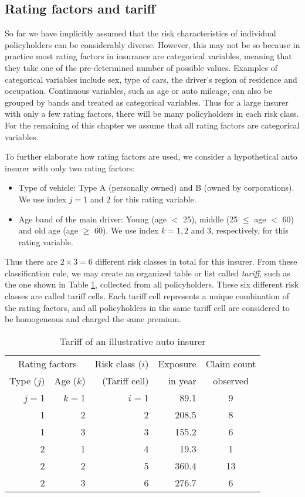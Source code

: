\documentclass[12pt]{article}
\begin{document}
\subsection{Rating factors and tariff}
So far we have implicitly assumed that the risk characteristics of individual policyholders can be considerably diverse. However, this may not be so because in practice most rating factors in insurance are categorical variables, meaning that they take one of the pre-determined number of possible values. Examples of categorical variables include sex, type of cars, the driver's region of residence and occupation. Continuous variables, such as age or auto mileage, can also be grouped by bands and treated as categorical variables. Thus for a large insurer with only a few rating factors, there will be many policyholders in each risk class. For the remaining of this chapter we assume that all rating factors are categorical variables. 

To further elaborate how rating factors are used, we consider a hypothetical auto insurer with only two rating factors:
\begin{itemize}
  \item Type of vehicle: Type A (personally owned) and B (owned by corporations). We use index $j=1$ and $2$ for this rating variable.
  \item Age band of the main driver:  Young (age $<$ 25), middle (25 $\le$ age $<$ 60) and old age (age $\ge$ 60). We use index $k=1, 2$ and $3$, respectively, for this rating variable.
\end{itemize}
Thus there are $2 \times 3=6$ different risk classes in total for this insurer. From these classification rule, we may create an organized  table or list called \textit{tariff}, such as the one shown in Table \ref{tab.tariff.1}, collected from all policyholders. These six different risk classes are called tariff cells. Each tariff cell represents a unique combination of the rating factors, and all policyholders in the same tariff cell are considered to be homogeneous and charged the same premium.
\begin{table}[htp]
\caption{Tariff of an illustrative auto insurer}
\begin{center}
\begin{tabular}{rrrrc}
 \hline
 \multicolumn{2}{c}{Rating factors } &  Risk class ($i$)& Exposure & Claim count \\
 \cline{1-2} 
Type ($j$) & Age ($k$) & (Tariff cell) &  in year & observed\\
\hline \hline
$j=$1 & $k=$1 & $i=$1 & 89.1 & 9\\
1 & 2 &2  & 208.5& 8\\
1 & 3 & 3 & 155.2 & 6  \\
2  & 1 & 4 & 19.3 & 1 \\
2  & 2 & 5 & 360.4 & 13 \\
2   & 3 & 6 & 276.7 & 6 \\ \hline
\end{tabular}
\end{center}
\label{tab.tariff.1}
\end{table}%
\end{document}
